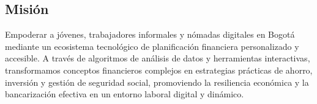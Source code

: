{}
\subsection*{Misión}

Empoderar a jóvenes, trabajadores informales y nómadas digitales en Bogotá mediante un ecosistema tecnológico de planificación financiera personalizado y accesible. A través de algoritmos de análisis de datos y herramientas interactivas, transformamos conceptos financieros complejos en estrategias prácticas de ahorro, inversión y gestión de seguridad social, promoviendo la resiliencia económica y la bancarización efectiva en un entorno laboral digital y dinámico.